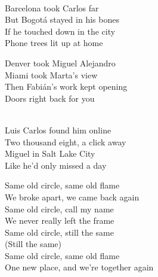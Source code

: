 \begin{lyrics}
\\
Barcelona took Carlos far\\
But Bogotá stayed in his bones\\
If he touched down in the city\\
Phone trees lit up at home

Denver took Miguel Alejandro\\
Miami took Marta’s view\\
Then Fabián’s work kept opening\\
Doors right back for you

\\
Luis Carlos found him online\\
Two thousand eight, a click away\\
Miguel in Salt Lake City\\
Like he’d only missed a day

Same old circle, same old flame\\
We broke apart, we came back again\\
Same old circle, call my name\\
We never really left the frame\\
Same old circle, still the same\\
(Still the same)\\
Same old circle, same old flame\\
One new place, and we’re together again

\end{lyrics}

